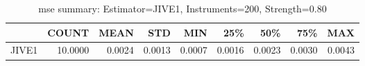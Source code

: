 \begin{table}[ht]
\centering
\caption{mse summary: Estimator=JIVE1, Instruments=200, Strength=0.80}
\begin{tabular}{lrrrrrrrr}
\toprule
 & COUNT & MEAN & STD & MIN & 25\% & 50\% & 75\% & MAX \\
\midrule
JIVE1 & 10.0000 & 0.0024 & 0.0013 & 0.0007 & 0.0016 & 0.0023 & 0.0030 & 0.0043 \\
\bottomrule
\end{tabular}
\end{table}
